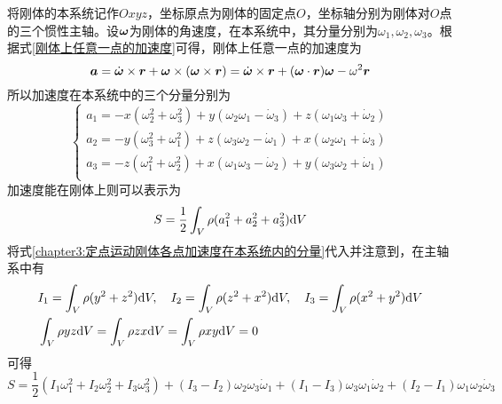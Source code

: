 将刚体的本系统记作$Oxyz$，坐标原点为刚体的固定点$O$，坐标轴分别为刚体对$O$点的三个惯性主轴。设$\boldsymbol{\omega}$为刚体的角速度，在本系统中，其分量分别为$\omega_1,\omega_2,\omega_3$。根据式\eqref{刚体上任意一点的加速度}可得，刚体上任意一点的加速度为
\begin{equation}
	\boldsymbol{a} = \dot{\boldsymbol{\omega}} \times \boldsymbol{r} + \boldsymbol{\omega} \times \left(\boldsymbol{\omega} \times \boldsymbol{r}\right) = \dot{\boldsymbol{\omega}} \times \boldsymbol{r} + (\boldsymbol{\omega}\cdot\boldsymbol{r})\boldsymbol{\omega} - \omega^2 \boldsymbol{r}
\end{equation}
所以加速度在本系统中的三个分量分别为
\begin{equation}
\begin{cases}
	a_1 = -x(\omega_2^2+\omega_3^2)+y(\omega_2\omega_1-\dot{\omega}_3)+z(\omega_1\omega_3+\dot{\omega}_2) \\
	a_2 = -y(\omega_3^2+\omega_1^2)+z(\omega_3\omega_2-\dot{\omega}_1)+x(\omega_2\omega_1+\dot{\omega}_3) \\
	a_3 = -z(\omega_1^2+\omega_2^2)+x(\omega_1\omega_3-\dot{\omega}_2)+y(\omega_3\omega_2+\dot{\omega}_1) \\
\end{cases}
\label{chapter3:定点运动刚体各点加速度在本系统内的分量}
\end{equation}
加速度能在刚体上则可以表示为
\begin{equation*}
	S = \frac12 \int_V \rho (a_1^2+a_2^2+a_3^2)\mathrm{d} V
\end{equation*}
将式\eqref{chapter3:定点运动刚体各点加速度在本系统内的分量}代入并注意到，在主轴系中有
\begin{align*}
	& I_1 = \int_V \rho(y^2+z^2)\mathrm{d} V, \quad I_2 = \int_V \rho(z^2+x^2)\mathrm{d} V, \quad I_3 = \int_V \rho(x^2+y^2)\mathrm{d} V \\
	& \int_V \rho yz\mathrm{d} V = \int_V \rho zx\mathrm{d} V = \int_V \rho xy\mathrm{d} V = 0
\end{align*}
可得
\begin{equation}
	S = \frac12 (I_1\omega_1^2 + I_2\omega_2^2 + I_3\omega_3^2) + (I_3-I_2)\omega_2\omega_3\dot{\omega}_1 + (I_1-I_3)\omega_3\omega_1\dot{\omega}_2 + (I_2-I_1)\omega_1\omega_2\dot{\omega}_3
	\label{chapter3:定点运动刚体的加速度能}
\end{equation}

